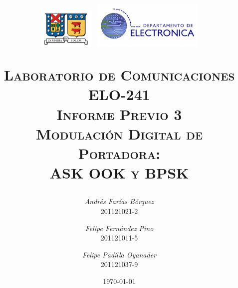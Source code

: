 
\begin{titlepage}
\title{\begin{minipage}{\textwidth}
\vspace{-9em}
\includegraphics[width=0.2\textwidth]{img/logo_utfsm}
\hfill
\includegraphics[width=0.4\textwidth]{img/logoelo2}
\vspace{1em}
\end{minipage}
\HRule \vspace{1em} \textsc{Laboratorio de Comunicaciones\\ELO-241\\ \Large \vspace{1em} \textbf{Informe Previo 3}\\Modulación Digital de Portadora:\\ASK OOK y BPSK} \HRule \vspace{3em}}
\author{\textsl{Andrés Farías Bórquez}\\201121021-2 \and \textsl{Felipe Fernández Pino}\\201121011-5 \and \textsl{Felipe Padilla Oyanader}\\201121037-9}
\date{\vfill \today}
\end{titlepage}

\pagestyle{fancy}
